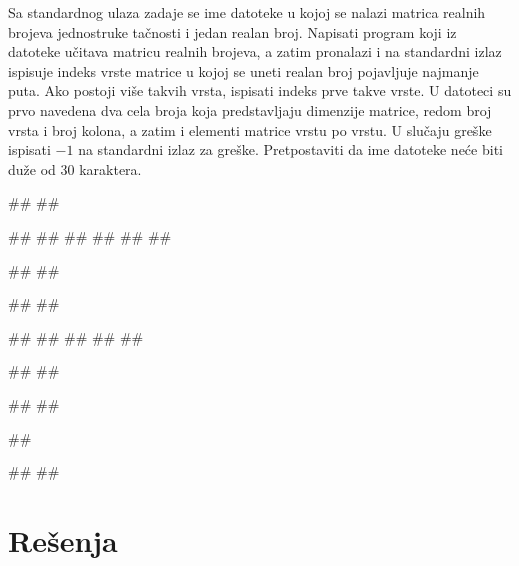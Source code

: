 \begin{Exercise}[label=A_12]
Sa standardnog ulaza zadaje se ime datoteke u kojoj se nalazi matrica realnih brojeva jednostruke tačnosti
i jedan realan broj. Napisati program koji iz datoteke učitava matricu realnih brojeva, a zatim pronalazi i na standardni
izlaz ispisuje indeks vrste matrice u kojoj se uneti realan broj pojavljuje najmanje puta. Ako postoji više takvih vrsta,
ispisati indeks prve takve vrste. U datoteci su prvo navedena dva cela broja koja predstavljaju dimenzije matrice, redom broj
vrsta i broj kolona, a zatim i elementi matrice vrstu po vrstu. U slučaju greške ispisati $-1$ na standardni izlaz za greške.
Pretpostaviti da ime datoteke neće biti duže od $30$ karaktera. 

\begin{minitest}
\begin{test}{1}
#\naslovUlaz#
##

##
##
##
##
##
##

#\naslovIzlaz#
##
\end{test}
\end{minitest}
\begin{minitest}
\begin{test}{2}
#\naslovUlaz#
##

##
##
##
##
##

#\naslovIzlaz#
##
\end{test}
\end{minitest}
\begin{minitest}
\begin{test}{3}
#\naslovUlaz#
##

##

#\naslovIzlazZaGresku#
##
\end{test}
\end{minitest}

\iffalse
\begin{minitest}
\begin{test}{3}
#\naslovUlaz#
#\ulaz{matrica.txt 7}#

#\naslovDat{matrica.txt}#
#\datoteka{3 2}#
#\datoteka{1.1 -5.31}#
#\datoteka{-3.7 35.24}#
#\datoteka{1.4 2.09}#

#\naslovIzlaz#
#\izlaz{0}#
\end{test}
\end{minitest}
\fi

\end{Exercise}
\begin{Answer}[ref=A_12]
\end{Answer}

\section{Rešenja}
\shipoutAnswer

